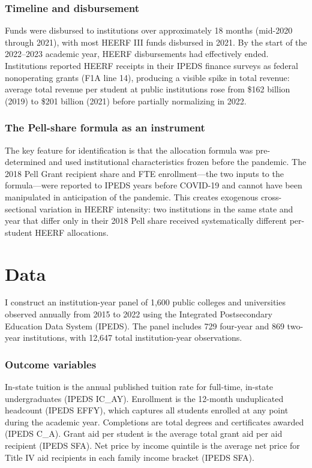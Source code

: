 \documentclass[12pt]{article}
\begin{document}
\subsubsection*{Timeline and disbursement} Funds were disbursed to institutions over approximately 18 months (mid-2020 through 2021), with most HEERF III funds disbursed in 2021. By the start of the 2022--2023 academic year, HEERF disbursements had effectively ended. Institutions reported HEERF receipts in their IPEDS finance surveys as federal nonoperating grants (F1A line 14), producing a visible spike in total revenue: average total revenue per student at public institutions rose from \$162 billion (2019) to \$201 billion (2021) before partially normalizing in 2022.

\subsubsection*{The Pell-share formula as an instrument} The key feature for identification is that the allocation formula was pre-determined and used institutional characteristics frozen before the pandemic. The 2018 Pell Grant recipient share and FTE enrollment---the two inputs to the formula---were reported to IPEDS years before COVID-19 and cannot have been manipulated in anticipation of the pandemic. This creates exogenous cross-sectional variation in HEERF intensity: two institutions in the same state and year that differ only in their 2018 Pell share received systematically different per-student HEERF allocations.

\section{Data}

I construct an institution-year panel of 1,600 public colleges and universities observed annually from 2015 to 2022 using the Integrated Postsecondary Education Data System (IPEDS). The panel includes 729 four-year and 869 two-year institutions, with 12,647 total institution-year observations.

\subsubsection*{Outcome variables} In-state tuition is the annual published tuition rate for full-time, in-state undergraduates (IPEDS IC\_AY). Enrollment is the 12-month unduplicated headcount (IPEDS EFFY), which captures all students enrolled at any point during the academic year. Completions are total degrees and certificates awarded (IPEDS C\_A). Grant aid per student is the average total grant aid per aid recipient (IPEDS SFA). Net price by income quintile is the average net price for Title IV aid recipients in each family income bracket (IPEDS SFA).
\end{document}
